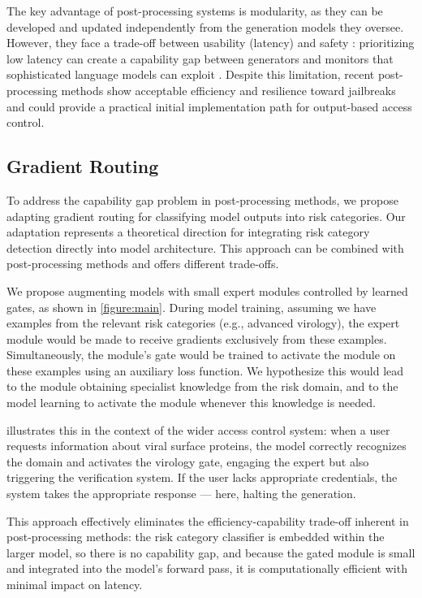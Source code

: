 \documentclass{article}
\theoremstyle{plain}
\theoremstyle{definition}
\theoremstyle{remark}
\begin{document}
The key advantage of post-processing systems is modularity, as they can be developed and updated independently from the generation models they oversee.
However, they face a trade-off between usability (latency) and safety \cite{kumar2025freelunchguardrails}: prioritizing low latency can create a capability gap between generators and monitors that sophisticated language models can exploit \cite{jin2024jailbreakinglargelanguagemodels}.
Despite this limitation, recent post-processing methods show acceptable efficiency and resilience toward jailbreaks \cite{sharma2025constitutionalclassifiersdefendinguniversal} and could provide a practical initial implementation path for output-based access control.

\subsection{Gradient Routing} \label{section:gradient-routing}

To address the capability gap problem in post-processing methods, we propose adapting gradient routing \cite{cloud2024gradientroutingmaskinggradients} for classifying model outputs into risk categories.
Our adaptation represents a theoretical direction for integrating risk category detection directly into model architecture.
This approach can be combined with post-processing methods and offers different trade-offs.

We propose augmenting models with small expert modules controlled by learned gates, as shown in \cref{figure:main}.
During model training, assuming we have examples from the relevant risk categories (e.g., advanced virology), the expert module would be made to receive gradients exclusively from these examples.
Simultaneously, the module's gate would be trained to activate the module on these examples using an auxiliary loss function.
We hypothesize this would lead to the module obtaining specialist knowledge from the risk domain, and to the model learning to activate the module whenever this knowledge is needed.

 illustrates this in the context of the wider access control system: when a user requests information about viral surface proteins, the model correctly recognizes the domain and activates the virology gate, engaging the expert but also triggering the verification system. If the user lacks appropriate credentials, the system takes the appropriate response --- here, halting the generation.

This approach effectively eliminates the efficiency-capability trade-off inherent in post-processing methods: the risk category classifier is embedded within the larger model, so there is no capability gap, and because the gated module is small and integrated into the model's forward pass, it is computationally efficient with minimal impact on latency.
\end{document}

